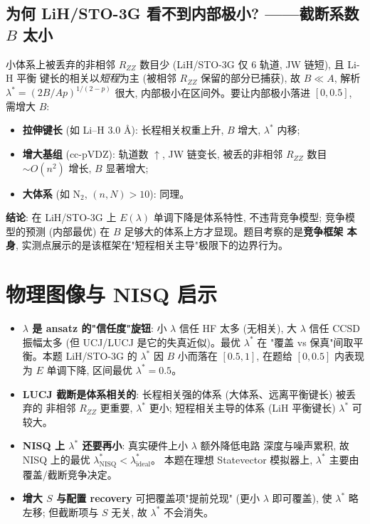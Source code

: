 \documentclass[11pt]{article}
\begin{document}
\subsection*{为何 LiH/STO-3G 看不到内部极小? ——截断系数 $B$ 太小}
小体系上被丢弃的非相邻 $R_{ZZ}$ 数目少 (LiH/STO-3G 仅 6 轨道, JW 链短), 且 Li-H 平衡
键长的相关以\emph{短程}为主 (被相邻 $R_{ZZ}$ 保留的部分已捕获), 故 $B\ll A$, 解析
$\lambda^\ast=(2B/Ap)^{1/(2-p)}$ 很大, 内部极小在区间外。要让内部极小落进 $[0,0.5]$,
需增大 $B$:
\begin{itemize}
  \item \textbf{拉伸键长} (如 Li--H $3.0$ Å): 长程相关权重上升, $B$ 增大, $\lambda^\ast$
    内移;
  \item \textbf{增大基组} (cc-pVDZ): 轨道数 $\uparrow$, JW 链变长, 被丢的非相邻
    $R_{ZZ}$ 数目 $\sim O(n^2)$ 增长, $B$ 显著增大;
  \item \textbf{大体系} (如 N$_2$, $(n,N){>}10$): 同理。
\end{itemize}
\textbf{结论}: 在 LiH/STO-3G 上 $E(\lambda)$ 单调下降是体系特性, 不违背竞争模型;
竞争模型的预测 (内部最优) 在 $B$ 足够大的体系上方才显现。题目考察的是\textbf{竞争框架
本身}, 实测点展示的是该框架在"短程相关主导"极限下的边界行为。

\section{物理图像与 NISQ 启示}
\begin{itemize}
  \item \textbf{$\lambda$ 是 ansatz 的"信任度"旋钮}: 小 $\lambda$ 信任 HF 太多 (无相关),
    大 $\lambda$ 信任 CCSD 振幅太多 (但 UCJ/LUCJ 是它的失真近似)。最优 $\lambda^\ast$ 在
    "覆盖 vs 保真"间取平衡。本题 LiH/STO-3G 的 $\lambda^\ast$ 因 $B$ 小而落在 $[0.5,1]$,
    在题给 $[0,0.5]$ 内表现为 $E$ 单调下降, 区间最优 $\lambda^\ast=0.5$。
  \item \textbf{LUCJ 截断是体系相关的}: 长程相关强的体系 (大体系、远离平衡键长) 被丢弃的
    非相邻 $R_{ZZ}$ 更重要, $\lambda^\ast$ 更小; 短程相关主导的体系 (LiH 平衡键长)
    $\lambda^\ast$ 可较大。
  \item \textbf{NISQ 上 $\lambda^\ast$ 还要再小}: 真实硬件上小 $\lambda$ 额外降低电路
    深度与噪声累积, 故 NISQ 上的最优 $\lambda^\ast_{\text{NISQ}}<\lambda^\ast_{\text{ideal}}$。
    本题在理想 Statevector 模拟器上, $\lambda^\ast$ 主要由覆盖/截断竞争决定。
  \item \textbf{增大 $S$ 与配置 recovery} 可把覆盖项"提前兑现" (更小 $\lambda$ 即可覆盖),
    使 $\lambda^\ast$ 略左移; 但截断项与 $S$ 无关, 故 $\lambda^\ast$ 不会消失。
\end{itemize}
\end{document}
